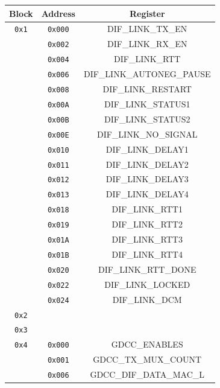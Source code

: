 \begin{table}[H]
  \centering \bgroup
  \def\arraystretch{1.3}%
  \begin{tabular}{|c|c|c|}
    \hline
    \textbf{Block} & \textbf{Address} & \textbf{Register} \\
    \hline
    \texttt{0x1} & \texttt{0x000} & DIF\_LINK\_TX\_EN \\
                   & \texttt{0x002} & DIF\_LINK\_RX\_EN \\
                   & \texttt{0x004} & DIF\_LINK\_RTT \\
                   & \texttt{0x006} & DIF\_LINK\_AUTONEG\_PAUSE \\
                   & \texttt{0x008} & DIF\_LINK\_RESTART \\
                   & \texttt{0x00A} & DIF\_LINK\_STATUS1 \\
                   & \texttt{0x00B} & DIF\_LINK\_STATUS2 \\
                   & \texttt{0x00E} & DIF\_LINK\_NO\_SIGNAL \\
                   & \texttt{0x010} & DIF\_LINK\_DELAY1 \\
                   & \texttt{0x011} & DIF\_LINK\_DELAY2 \\
                   & \texttt{0x012} & DIF\_LINK\_DELAY3 \\
                   & \texttt{0x013} & DIF\_LINK\_DELAY4 \\
                   & \texttt{0x018} & DIF\_LINK\_RTT1 \\
                   & \texttt{0x019} & DIF\_LINK\_RTT2 \\
                   & \texttt{0x01A} & DIF\_LINK\_RTT3 \\
                   & \texttt{0x01B} & DIF\_LINK\_RTT4 \\
                   & \texttt{0x020} & DIF\_LINK\_RTT\_DONE \\
                   & \texttt{0x022} & DIF\_LINK\_LOCKED \\
                   & \texttt{0x024} & DIF\_LINK\_DCM \\
    \hline
    \texttt{0x2} & & \\
    \hline
    \texttt{0x3} & & \\
    \hline
    \texttt{0x4} & \texttt{0x000} & GDCC\_ENABLES \\
                   & \texttt{0x001} & GDCC\_TX\_MUX\_COUNT \\
                   & \texttt{0x006} & GDCC\_DIF\_DATA\_MAC\_L \\

\end{tabular}
\end{table}
